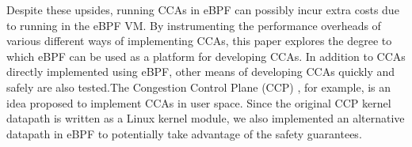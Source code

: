 \documentclass[../main.tex]{subfiles}
\begin{document}
Despite these upsides, running CCAs in eBPF can possibly incur extra costs due to running in the eBPF VM. By instrumenting the performance overheads of various different ways of implementing CCAs, this paper explores the degree to which eBPF can be used as a platform for developing CCAs. In addition to CCAs directly implemented using eBPF, other means of developing CCAs quickly and safely are also tested.The Congestion Control Plane (CCP) \cite{cpp}, for example, is an idea proposed to implement CCAs in user space. Since the original CCP kernel datapath is written as a Linux kernel module, we also implemented an alternative datapath in eBPF to potentially take advantage of the safety guarantees.
\end{document}
